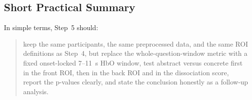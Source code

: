 \subsection{Short Practical Summary}
In simple terms, Step~5 should:
\begin{quote}
keep the same participants, the same preprocessed data, and the same ROI definitions as Step~4,
but replace the whole-question-window metric with a fixed onset-locked 7--11~s HbO window,
test abstract versus concrete first in the front ROI, then in the back ROI and in the dissociation score,
report the p-values clearly, and state the conclusion honestly as a follow-up analysis.
\end{quote}
